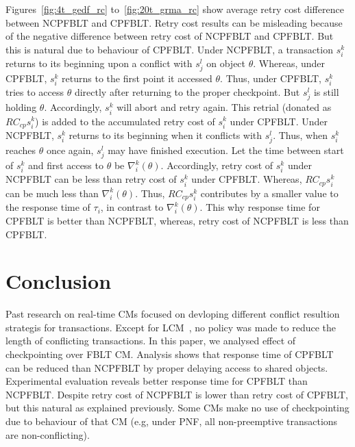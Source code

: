 \documentclass[preprint]{sigplanconf}
\begin{document}
Figures~\ref{fig:4t_gedf_rc} to~\ref{fig:20t_grma_rc} show average retry cost difference between NCPFBLT and CPFBLT. Retry cost results can be misleading because of the negative difference between retry cost of NCPFBLT and CPFBLT. But this is natural due to behaviour of CPFBLT. Under NCPFBLT, a transaction $s_i^k$ returns to its beginning upon a conflict with $s_j^l$ on object $\theta$. Whereas, under CPFBLT, $s_i^k$ returns to the first point it accessed $\theta$. Thus, under CPFBLT, $s_i^k$ tries to access $\theta$ directly after returning to the proper checkpoint. But $s_j^l$ is still holding $\theta$. Accordingly, $s_i^k$ will abort and retry again. This retrial (donated as $RC_{cp}s_i^k$) is added to the accumulated retry cost of $s_i^k$ under CPFBLT. Under NCPFBLT, $s_i^k$ returns to its beginning when it conflicts with $s_j^l$. Thus, when $s_i^k$ reaches $\theta$ once again, $s_j^l$ may have finished execution. Let the time between start of $s_i^k$ and first access to $\theta$ be $\nabla_i^k(\theta)$. Accordingly, retry cost of $s_i^k$ under NCPFBLT can be less than retry cost of $s_i^k$ under CPFBLT. Whereas, $RC_{cp}s_i^k$ can be much less than $\nabla_i^k(\theta)$. Thus, $RC_{cp}s_i^k$ contributes by a smaller value to the response time of $\tau_i$, in contrast to $\nabla_i^k(\theta)$. This why response time for CPFBLT is better than NCPFBLT, whereas, retry cost of NCPFBLT is less than CPFBLT.
\section{Conclusion}\label{sec:conclusion}

Past research on real-time CMs focused on devloping different conflict resultion strategis for transactions. Except for LCM~\citep{lcmdac2012}, no policy was made to reduce the length of conflicting transactions. In this paper, we analysed effect of checkpointing over FBLT CM. Analysis shows that response time of CPFBLT can be reduced than NCPFBLT by proper delaying access to shared objects. Experimental evaluation reveals better response time for CPFBLT than NCPFBLT. Despite retry cost of NCPFBLT is lower than retry cost of CPFBLT, but this natural as explained previously. Some CMs make no use of checkpointing due to behaviour of that CM (e.g, under PNF, all non-preemptive transactions are non-conflicting).



\end{document}
